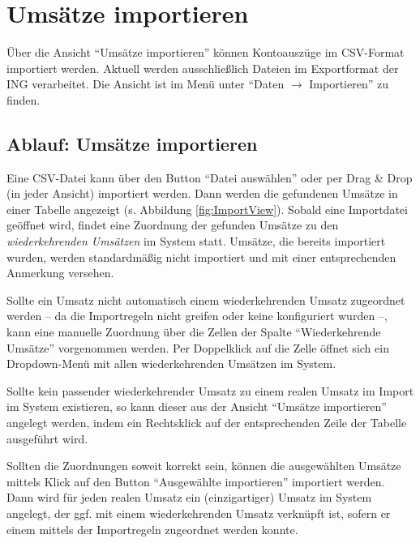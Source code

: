 \chapter{Umsätze importieren} \label{chap:import}

Über die Ansicht "`Umsätze importieren"' können Kontoauszüge im CSV-Format importiert werden. Aktuell werden ausschließlich Dateien im Exportformat der ING verarbeitet. Die Ansicht ist im Menü unter "`Daten $\rightarrow$ Importieren"' zu finden.

\section{Ablauf: Umsätze importieren}

Eine CSV-Datei kann über den Button "`Datei auswählen"' oder per Drag \& Drop (in jeder Ansicht) importiert werden. Dann werden die gefundenen Umsätze in einer Tabelle angezeigt (s. Abbildung \ref{fig:ImportView}). Sobald eine Importdatei geöffnet wird, findet eine Zuordnung der gefunden Umsätze zu den \textit{wiederkehrenden Umsätzen} im System statt. Umsätze, die bereits importiert wurden, werden standardmäßig nicht importiert und mit einer entsprechenden Anmerkung versehen.

Sollte ein Umsatz nicht automatisch einem wiederkehrenden Umsatz zugeordnet werden -- da die Importregeln nicht greifen oder keine konfiguriert wurden --, kann eine manuelle Zuordnung über die Zellen der Spalte "`Wiederkehrende Umsätze"' vorgenommen werden. Per Doppelklick auf die Zelle öffnet sich ein Dropdown-Menü mit allen wiederkehrenden Umsätzen im System.

Sollte kein passender wiederkehrender Umsatz zu einem realen Umsatz im Import im System existieren, so kann dieser aus der Ansicht "`Umsätze importieren"' angelegt werden, indem ein Rechtsklick auf der entsprechenden Zeile der Tabelle ausgeführt wird. 

Sollten die Zuordnungen soweit korrekt sein, können die ausgewählten Umsätze mittels Klick auf den Button "`Ausgewählte importieren"' importiert werden. Dann wird für jeden realen Umsatz ein (einzigartiger) Umsatz im System angelegt, der ggf. mit einem wiederkehrenden Umsatz verknüpft ist, sofern er einem mittels der Importregeln zugeordnet werden konnte.


